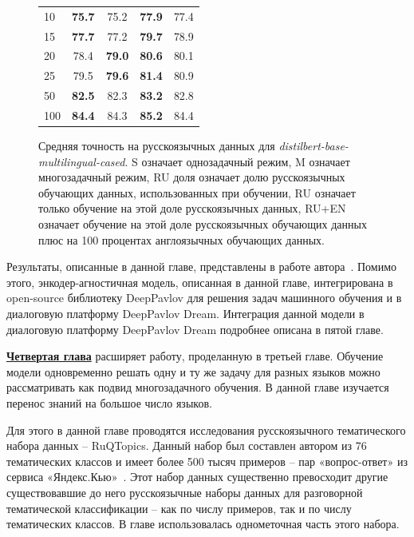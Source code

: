 \begin{figure}[!htbp]
\begin{minipage}{0.45\textwidth}
{{\begin{tabular}[baseline={(0,2.1)}]{|l||c|c|c|c|}
10 & \textbf{75.7} & 75.2 & \textbf{77.9} & 77.4\\ 
15 & \textbf{77.7} & 77.2 & \textbf{79.7} & 78.9\\ 
20 & 78.4 & \textbf{79.0} & \textbf{80.6} & 80.1 \\ 
25 & 79.5 & \textbf{79.6} & \textbf{81.4} & 80.9 \\ 
50 & \textbf{82.5} & 82.3 & \textbf{83.2} & 82.8 \\ 
100 & \textbf{84.4} & 84.3 & \textbf{85.2} & 84.4 \\ \hline
\end{tabular}}
}
\end{minipage}
\caption{Средняя точность на русскоязычных данных для \textit{distilbert-base-multilingual-cased}. S означает однозадачный режим, M означает многозадачный режим, RU доля означает долю русскоязычных обучающих данных, использованных при обучении, RU означает только обучение на этой доле русскоязычных данных, RU+EN означает обучение на этой доле русскоязычных обучающих данных плюс на 100 процентах англоязычных обучающих данных.}
\label{fig:tr-ag:ru_dialog_part}
\end{figure}

Результаты, описанные в данной главе, представлены в работе автора~\cite{rumtl}. Помимо этого, энкодер-агностичная модель, описанная в данной главе, интегрирована в open-source библиотеку DeepPavlov для решения задач машинного обучения и в диалоговую платформу DeepPavlov Dream. Интеграция данной модели в диалоговую платформу DeepPavlov Dream подробнее описана в {пятой главе}.

\underline{\textbf{Четвертая глава}} расширяет работу, проделанную в {третьей главе}. Обучение модели одновременно решать одну и ту же задачу для разных языков можно рассматривать как подвид многозадачного обучения. В данной главе изучается перенос знаний на большое число языков. 

Для этого в данной главе проводятся исследования русскоязычного тематического набора данных -- RuQTopics.  Данный набор был составлен автором из 76 тематических классов и имеет более 500 тысяч примеров -- пар «вопрос-ответ» из сервиса «Яндекс.Кью»~\cite{yandex_q}. Этот набор данных существенно превосходит другие существовавшие до него русскоязычные наборы данных для разговорной тематической классификации -- как по числу примеров, так и по числу тематических классов. В главе использовалась однометочная часть этого набора. 

